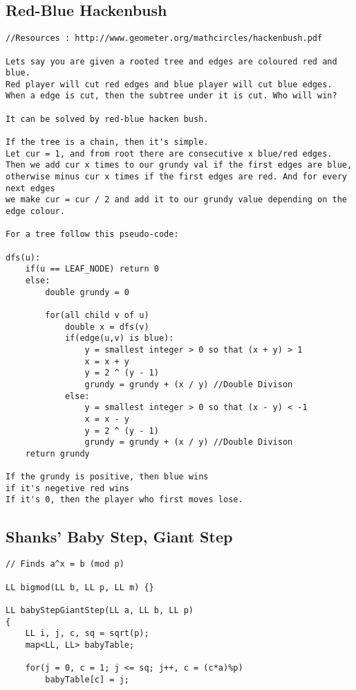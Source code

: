 \documentclass[FSZ,a4paper,onesided]{article}
\begin{document}
\begin{multicols*}{\COLS}
\subsection{Red-Blue Hackenbush}
\begin{lstlisting}
//Resources : http://www.geometer.org/mathcircles/hackenbush.pdf

Lets say you are given a rooted tree and edges are coloured red and blue.
Red player will cut red edges and blue player will cut blue edges.
When a edge is cut, then the subtree under it is cut. Who will win?

It can be solved by red-blue hacken bush.

If the tree is a chain, then it's simple. 
Let cur = 1, and from root there are consecutive x blue/red edges.
Then we add cur x times to our grundy val if the first edges are blue,
otherwise minus cur x times if the first edges are red. And for every next edges
we make cur = cur / 2 and add it to our grundy value depending on the edge colour.

For a tree follow this pseudo-code:

dfs(u):
    if(u == LEAF_NODE) return 0
    else:
        double grundy = 0
        
        for(all child v of u)
            double x = dfs(v)
            if(edge(u,v) is blue):
                y = smallest integer > 0 so that (x + y) > 1
                x = x + y
                y = 2 ^ (y - 1)
                grundy = grundy + (x / y) //Double Divison
            else:
                y = smallest integer > 0 so that (x - y) < -1
                x = x - y
                y = 2 ^ (y - 1)
                grundy = grundy + (x / y) //Double Divison
    return grundy

If the grundy is positive, then blue wins
if it's negetive red wins
If it's 0, then the player who first moves lose.
\end{lstlisting}
\subsection{Shanks' Baby Step, Giant Step}
\begin{lstlisting}
// Finds a^x = b (mod p)

LL bigmod(LL b, LL p, LL m) {}

LL babyStepGiantStep(LL a, LL b, LL p)
{
    LL i, j, c, sq = sqrt(p);
    map<LL, LL> babyTable;

    for(j = 0, c = 1; j <= sq; j++, c = (c*a)%p)
        babyTable[c] = j;


\end{lstlisting}
\end{multicols*}
\end{document}
